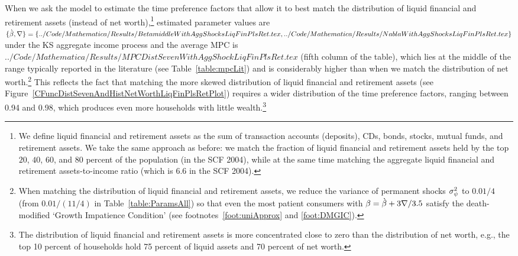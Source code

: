 \documentclass[12pt,titlepage]{econtex}
\begin{document}
When we ask the model to estimate the time preference factors that
allow it to best match the distribution of liquid financial and retirement assets (instead
of net worth),\footnote{We define liquid financial and retirement assets as the sum of transaction accounts (deposits),
  CDs, bonds, stocks, mutual funds, and retirement assets.  We take the same approach as before: we match
  the fraction of liquid financial and retirement assets held by the top $20$, $40$, $60$,
  and $80$ percent of the population (in the SCF 2004), while at the
  same time matching the aggregate liquid financial and retirement assets-to-income ratio (which is 6.6 in the SCF 2004).}
estimated parameter values are
$\{\grave{\beta}, \nabla\}=\{
../Code/Mathematica/Results/BetamiddleWithAggShocksLiqFinPlsRet.tex ,
../Code/Mathematica/Results/NablaWithAggShocksLiqFinPlsRet.tex \}
$
under the KS aggregate income process and the average MPC is
$
../Code/Mathematica/Results/MPCDistSevenWithAggShockLiqFinPlsRet.tex
$ (fifth column of the table), which lies at the middle of the
range typically reported in the literature (see
Table~\ref{table:mpcLit}) and is considerably higher than when we
match the distribution of net worth.\footnote{When matching the distribution of liquid financial and retirement assets, we reduce the variance of permanent shocks $\sigma _{\psi}^{2}$ to $0.01/4$ (from $0.01/(11/4)$ in Table~\ref{table:ParamsAll}) so that even the most patient consumers with  $\beta=\grave{\beta}+3\nabla/3.5$ satisfy the death-modified `Growth Impatience Condition' (see footnotes~\ref{foot:uniApprox} and \ref{foot:DMGIC}).} This reflects the fact that
matching the more skewed distribution of liquid financial and
retirement assets
(see
Figure~\ref{CFuncDistSevenAndHistNetWorthLiqFinPlsRetPlot}) requires
a wider distribution of the time preference factors, ranging between
0.94 and 0.98, which produces even more
households with little wealth.\footnote{The distribution of liquid financial and retirement assets is more concentrated close to zero than the distribution of net worth, e.g., the top 10 percent of households hold 75 percent of liquid assets and 70 percent of net worth.
}
\end{document}
